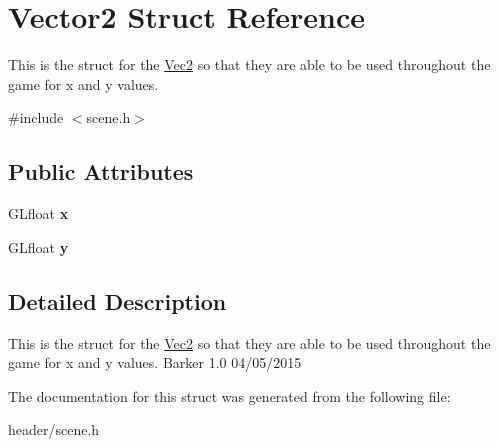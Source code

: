 \hypertarget{structVector2}{
\section{Vector2 Struct Reference}
\label{structVector2}
}


This is the struct for the \hyperlink{classVec2}{Vec2} so that they are able to be used throughout the game for x and y values.  


{\ttfamily \#include $<$scene.h$>$}\subsection*{Public Attributes}
\begin{DoxyCompactItemize}
\item 
\hypertarget{structVector2_aee9b1144706011d564ee03e8d2c0a119}{
GLfloat {\bfseries x}}
\label{structVector2_aee9b1144706011d564ee03e8d2c0a119}

\item 
\hypertarget{structVector2_aebec404285aa1bcf0db7db6aa79af4de}{
GLfloat {\bfseries y}}
\label{structVector2_aebec404285aa1bcf0db7db6aa79af4de}

\end{DoxyCompactItemize}


\subsection{Detailed Description}
This is the struct for the \hyperlink{classVec2}{Vec2} so that they are able to be used throughout the game for x and y values. Barker  1.0 04/05/2015 

The documentation for this struct was generated from the following file:\begin{DoxyCompactItemize}
\item 
header/scene.h\end{DoxyCompactItemize}

